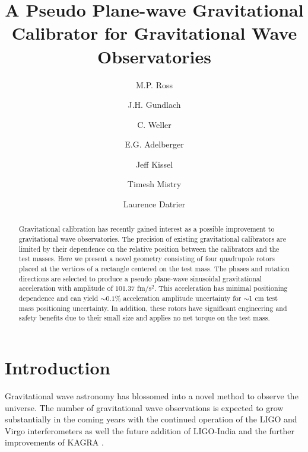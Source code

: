 \documentclass[superscriptaddress, twocolumn, prd]{revtex4-1}
\begin{document}
\title{A Pseudo Plane-wave Gravitational Calibrator for Gravitational Wave Observatories}

\author{M.P. Ross}
\author{J.H. Gundlach}
\author{C. Weller}
\author{E.G. Adelberger}
\author{Jeff Kissel}
\author{Timesh Mistry}
\author{Laurence Datrier}


\begin{abstract}

Gravitational calibration has recently gained interest as a possible improvement to gravitational wave observatories. The precision of existing gravitational calibrators are limited by their dependence on the relative position between the calibrators and the test masses. Here we present a novel geometry consisting of four quadrupole rotors placed at the vertices of a rectangle centered on the test mass. The phases and rotation directions are selected to produce a pseudo plane-wave  sinusoidal gravitational acceleration with amplitude of $101.37$ fm/s$^2$. This acceleration has minimal positioning dependence and can yield $\sim0.1 \%$ acceleration amplitude uncertainty for $\sim$1 cm test mass positioning uncertainty. In addition, these rotors have significant engineering and safety benefits due to their small size and applies no net torque on the test mass.

\end{abstract}

\maketitle

\section{Introduction}

Gravitational wave astronomy has blossomed into a novel method to observe the universe. The number of gravitational wave observations is expected to grow substantially in the coming years with the continued operation of the LIGO \cite{aLIGO} and Virgo \cite{virgo} interferometers as well the future addition of LIGO-India \cite{ligo-india} and the further improvements of KAGRA \cite{kagra}. 
\end{document}
